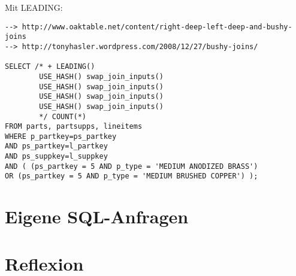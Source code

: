 \documentclass[11pt,a4paper,parskip=half]{scrartcl}
\begin{document}
Mit LEADING:
\begin{lstlisting}
--> http://www.oaktable.net/content/right-deep-left-deep-and-bushy-joins
--> http://tonyhasler.wordpress.com/2008/12/27/bushy-joins/

SELECT /* + LEADING()
        USE_HASH() swap_join_inputs()
        USE_HASH() swap_join_inputs()
        USE_HASH() swap_join_inputs()
        USE_HASH() swap_join_inputs()
        */ COUNT(*)
FROM parts, partsupps, lineitems
WHERE p_partkey=ps_partkey
AND ps_partkey=l_partkey
AND ps_suppkey=l_suppkey
AND ( (ps_partkey = 5 AND p_type = 'MEDIUM ANODIZED BRASS')
OR (ps_partkey = 5 AND p_type = 'MEDIUM BRUSHED COPPER') );
\end{lstlisting}

\section{Eigene SQL-Anfragen}

\section{Reflexion}
\end{document}
